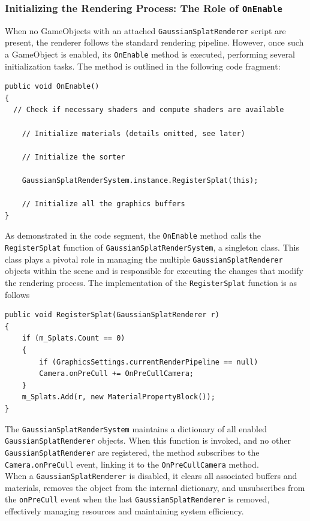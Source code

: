 \documentclass[12pt]{article}
\begin{document}
\subsubsection{Initializing the Rendering Process: The Role of \texttt{OnEnable}}
When no GameObjects with an attached \texttt{GaussianSplatRenderer} script are present, the renderer follows the standard rendering pipeline. However, once such a GameObject is enabled, its \texttt{OnEnable} method is executed, performing several initialization tasks. The method is outlined in the following code fragment:
\lstset{style=sharpc}
\begin{lstlisting}[tabsize=2,caption=\texttt{onEnable} of \texttt{GaussianSplatRenderer}, label=code:rendereronenable,breaklines=true,breakatwhitespace=true,basicstyle=\ttfamily\footnotesize]
public void OnEnable()
{
  // Check if necessary shaders and compute shaders are available

	// Initialize materials (details omitted, see later)
	
	// Initialize the sorter
	
	GaussianSplatRenderSystem.instance.RegisterSplat(this);
	
	// Initialize all the graphics buffers
}
\end{lstlisting}
As demonstrated in the code segment, the \texttt{OnEnable} method calls the \linebreak\texttt{RegisterSplat} function of \texttt{GaussianSplatRenderSystem}, a singleton class. This class plays a pivotal role in managing the multiple \linebreak\texttt{GaussianSplatRenderer} objects within the scene and is responsible for executing the changes that modify the rendering process. The implementation of the \texttt{RegisterSplat} function is as follows
\begin{lstlisting}[tabsize=2,caption=\texttt{RegisterSplat} of \texttt{GaussianSplatRenderSystem}, label=code:systemregister,breaklines=true,breakatwhitespace=true,basicstyle=\ttfamily\footnotesize]
public void RegisterSplat(GaussianSplatRenderer r)
{
	if (m_Splats.Count == 0)
	{
		if (GraphicsSettings.currentRenderPipeline == null)
		Camera.onPreCull += OnPreCullCamera;
	}
	m_Splats.Add(r, new MaterialPropertyBlock());
}
\end{lstlisting}
The \texttt{GaussianSplatRenderSystem} maintains a dictionary of all enabled \linebreak\texttt{GaussianSplatRenderer} objects. When this function is invoked, and no other \texttt{GaussianSplatRenderer} are registered, the method subscribes to the \texttt{Camera.onPreCull} event, linking it to the \texttt{OnPreCullCamera} method.\\
When a \texttt{GaussianSplatRenderer} is disabled, it clears all associated buffers and materials, removes the object from the internal dictionary, and unsubscribes from the \texttt{onPreCull} event when the last \texttt{GaussianSplatRenderer} is removed, effectively managing resources and maintaining system efficiency.
\end{document}

